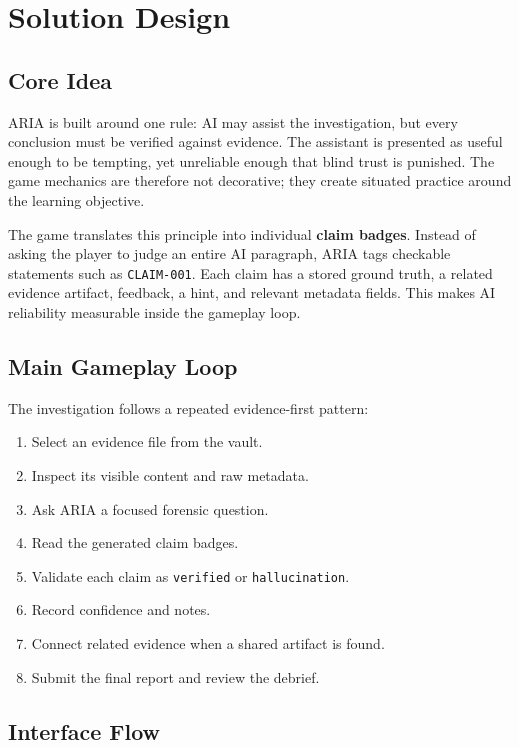 \chapter{Solution Design}

\section{Core Idea}

ARIA is built around one rule: AI may assist the investigation, but every conclusion must be verified against evidence. The assistant is presented as useful enough to be tempting, yet unreliable enough that blind trust is punished. The game mechanics are therefore not decorative; they create situated practice around the learning objective.

The game translates this principle into individual \textbf{claim badges}. Instead of asking the player to judge an entire AI paragraph, ARIA tags checkable statements such as \texttt{CLAIM-001}. Each claim has a stored ground truth, a related evidence artifact, feedback, a hint, and relevant metadata fields. This makes AI reliability measurable inside the gameplay loop.

\section{Main Gameplay Loop}

The investigation follows a repeated evidence-first pattern:

\begin{enumerate}[leftmargin=*]
  \item Select an evidence file from the vault.
  \item Inspect its visible content and raw metadata.
  \item Ask ARIA a focused forensic question.
  \item Read the generated claim badges.
  \item Validate each claim as \texttt{verified} or \texttt{hallucination}.
  \item Record confidence and notes.
  \item Connect related evidence when a shared artifact is found.
  \item Submit the final report and review the debrief.
\end{enumerate}

\section{Interface Flow}

